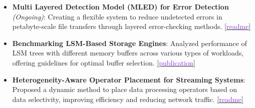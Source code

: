 \begin{itemize}
	\item \textbf{Multi Layered Detection Model (MLED) for Error Detection} \textit{(Ongoing)}: Creating a flexible system to reduce undetected errors in petabyte-scale file transfers through layered error-checking methods.
	      \href{https://github.com/shubham-sudo/mled}{[\textcolor{blueviolet}{readme}]}

	\item \textbf{Benchmarking LSM-Based Storage Engines}: Analyzed performance of LSM trees with different memory buffers across various types of workloads, offering guidelines for optimal buffer selection.
	      \href{https://shubhamkaushik.com/assets/pdf/LSMMemory.pdf}{[\textcolor{blueviolet}{publication}]}

	\item \textbf{Heterogeneity-Aware Operator Placement for Streaming Systems}: Proposed a dynamic method to place data processing operators based on data selectivity, improving efficiency and reducing network traffic.
	      \href{https://github.com/shubham-sudo/HeterogeneityAwareOperatorPlacementforStreamProcessingSystemsAtEdge-RaspberryPi}{[\textcolor{blueviolet}{readme}]}


\end{itemize}
